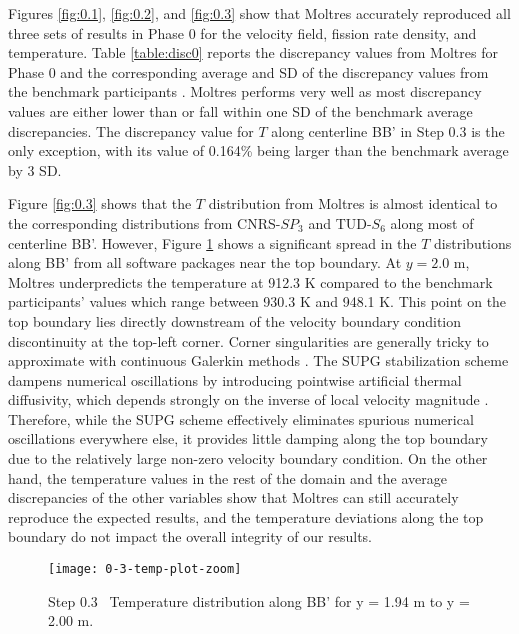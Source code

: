 Figures \ref{fig:0.1}, \ref{fig:0.2}, and \ref{fig:0.3} show that Moltres
accurately reproduced all three sets of results in Phase 0 for the velocity
field, fission rate density, and temperature. Table
\ref{table:disc0} reports the discrepancy values from Moltres for Phase 0 and
the corresponding average and \gls{SD} of the discrepancy values from
the benchmark participants
\cite{tiberga_results_2020}. Moltres performs very well as most discrepancy
values are either lower than or fall within one \gls{SD} of the benchmark
average discrepancies. The discrepancy value for $T$ along centerline BB' in
Step 0.3 is the only exception, with its value of 0.164\% being larger than
the benchmark average by 3 \gls{SD}.

Figure \ref{fig:0.3} shows that the $T$ distribution from Moltres is almost
identical to the corresponding distributions from CNRS-$SP_3$ and TUD-$S_6$
along most of centerline BB'. However, Figure \ref{fig:0.3-zoom} shows a
significant spread in the $T$ distributions along BB' from all software
packages near the top boundary. At $y = 2.0$ m, Moltres underpredicts the
temperature at 912.3 K compared to the benchmark participants' values which
range between 930.3 K and 948.1 K. This point on the top boundary lies directly downstream of
the velocity boundary condition discontinuity at the top-left corner.
Corner singularities are generally tricky to approximate with
continuous Galerkin methods \cite{kuhlmann_lid-driven_2018}.
The \gls{SUPG} stabilization scheme dampens numerical oscillations by
introducing pointwise artificial thermal diffusivity, which depends strongly on
the inverse of local velocity magnitude \cite{peterson_overview_2018}.
Therefore, while the \gls{SUPG} scheme effectively eliminates
spurious numerical oscillations everywhere else, it provides little damping
along the top boundary due to the relatively large non-zero velocity boundary
condition. On the other hand, the temperature values in the rest of the domain
and the average discrepancies of the other variables show that Moltres can
still accurately reproduce the expected results, and the temperature deviations
along the top boundary do not impact the overall integrity of our results.

\begin{figure}[htb]
	\centering
	\texttt{[image: 0-3-temp-plot-zoom]}
	\caption{Step 0.3 \textemdash\ Temperature distribution along BB' for y = 1.94 m to
	y = 2.00 m.}
	\label{fig:0.3-zoom}
\end{figure}


